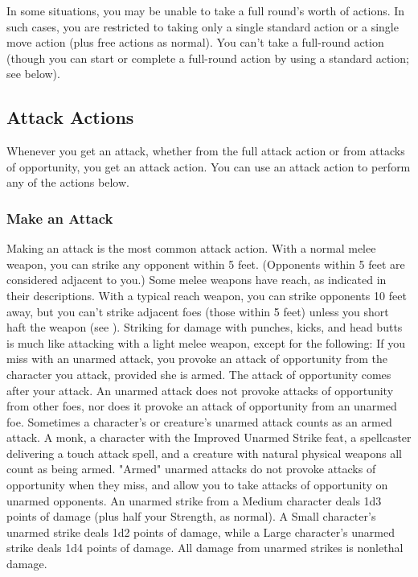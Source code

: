 In some situations, you may be unable to take a full round's worth of actions. In such cases, you are restricted to taking only a single standard action or a single move action (plus free actions as normal). You can't take a full-round action (though you can start or complete a full-round action by using a standard action; see below).

\subsection{Attack Actions}
Whenever you get an attack, whether from the full attack action or from attacks of opportunity, you get an attack action. You can use an attack action to perform any of the actions below.

\subsubsection{Make an Attack}
Making an attack is the most common attack action.
 With a normal melee weapon, you can strike any opponent within 5 feet. (Opponents within 5 feet are considered adjacent to you.) Some melee weapons have reach, as indicated in their descriptions. With a typical reach weapon, you can strike opponents 10 feet away, but you can't strike adjacent foes (those within 5 feet) unless you short haft the weapon (see ).
 Striking for damage with punches, kicks, and head butts is much like attacking with a light melee weapon, except for the following:
 If you miss with an unarmed attack, you provoke an attack of opportunity from the character you attack, provided she is armed. The attack of opportunity comes after your attack. An unarmed attack does not provoke attacks of opportunity from other foes, nor does it provoke an attack of opportunity from an unarmed foe.
 Sometimes a character's or creature's unarmed attack counts as an armed attack. A monk, a character with the Improved Unarmed Strike feat, a spellcaster delivering a touch attack spell, and a creature with natural physical weapons all count as being armed. "Armed" unarmed attacks do not provoke attacks of opportunity when they miss, and allow you to take attacks of opportunity on unarmed opponents.
 An unarmed strike from a Medium character deals 1d3 points of damage (plus half your Strength, as normal). A Small character's unarmed strike deals 1d2 points of damage, while a Large character's unarmed strike deals 1d4 points of damage. All damage from unarmed strikes is nonlethal damage.


